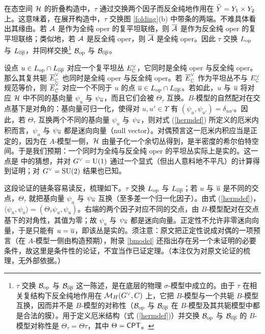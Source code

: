 在态空间 ${\mathcal H}$ 的折叠构造中，$\tau$ 通过交换两个因子而反全纯地作用在 $\widehat Y=Y_1\times Y_2$ 上。这意味着，在展开构造中，$\tau$ 交换图 \ref{folding}(b) 中带条的两端。不难具体看出其缘由。若 ${\mathcal A}$ 是作为全纯 oper 的复平坦联络，则 $\overline{{\mathcal A}}$ 是作为反全纯 oper 的复平坦联络；类似地，若 ${\mathcal A}$ 是反全纯 oper，则 $\overline{{\mathcal A}}$ 是全纯 oper。因此 $\tau$ 交换 $L_{\mathrm{op}}$ 与 $L_{\overline{\mathrm{op}}}$，并同样交换\footnote{$\tau$ 交换 ${\mathcal B}_{\mathrm{op}}$ 与 ${\mathcal B}_{\overline{\mathrm{op}}}$ 这一陈述，是在底层的物理 $\sigma$-模型中成立的。由于 $\tau$ 在相关复结构下反全纯地作用在 ${\mathcal M}_H(G^\vee,C)$ 上，它把 $B$-模型与一个共轭 $B$-模型互换，因而并不是 $B$-模型的对称性（${\mathcal B}_{\mathrm{op}}$ 与 ${\mathcal B}_{\overline{\mathrm{op}}}$ 在 $B$-模型及其共轭模型中都是合法的膜）。用于定义厄米结构（式 (\ref{hermdef})）并交换 ${\mathcal B}_{\mathrm{op}}$ 与 ${\mathcal B}_{\overline{\mathrm{op}}}$ 的 $B$-模型对称性是 $\Theta_\tau=\Theta\tau$，其中 $\Theta=\sf{CPT}$。} ${\mathcal B}_{\mathrm{op}}$ 与 ${\mathcal B}_{\overline{\mathrm{op}}}$。

设点 $u\in L_{\mathrm{op}}\cap L_{\overline{\mathrm{op}}}$ 对应一个复平坦丛 $E^\vee_{\mathbb C}$，它同时是全纯 oper 与反全纯 oper。那么其复共轭 $\overline E^\vee_{\mathbb C}$ 也同时是全纯 oper 与反全纯 oper。若 $\overline E^\vee_{\mathbb C}$ 作为平坦丛不与 $E^\vee_{\mathbb C}$ 规范等价，则 $\overline E^\vee_{\mathbb C}$ 对应一个不同于 $u$ 的点 $\overline u\in L_{\mathrm{op}}\cap L_{\overline{\mathrm{op}}}$。若如此，$u$ 与 $\overline u$ 将对应 ${\mathcal H}$ 中不同的基向量 $\psi_u$ 与 $\psi_{\overline u}$，而且它们会被 $\Theta_\tau$ 互换。$B$-模型的自然配对在交点基下是对角的：基向量可归一化，使得对 $u,u'\in \Upsilon$ 有 $(\psi_u,\psi_{u'})=\delta_{uu'}$。因此，若 $\Theta_\tau$ 互换两个不同的基向量 $\psi_u$ 与 $\psi_{\overline u}$，则对式 (\ref{hermdef}) 所定义的厄米内积而言，$\psi_u$ 与 $\psi_{\overline u}$ 都是迷向向量（null vector）。对偶预言这一厄米内积应当是正定的，因为在 $A$-模型一侧，${\mathcal H}$ 由量子化一个余切丛得到，是半密度的希尔伯特空间。于是我们预期：一个同时为全纯与反全纯 oper 的平坦丛实际上是实的。这一点是\cite{EFK,EFK2} 中的猜想，并对 $G^\vee={\mathrm U}(1)$ 通过一个显式（但出人意料地不平凡）的计算得到证明；对 $G^\vee={\mathrm{SU}}(2)$ 结果也已知\cite{Fal,Go}。

\begin{yizhu}
这段论证的链条容易读反，梳理如下。$\tau$ 交换 $L_{\mathrm{op}}$ 与 $L_{\overline{\mathrm{op}}}$；若 $u$ 与 $\overline u$ 是不同的交点，$\Theta_\tau$ 就把基向量 $\psi_u$ 与 $\psi_{\overline u}$ 互换（至多差一个归一化因子）。由式 (\ref{hermdef})，$\langle\psi_u,\psi_u\rangle=(\Theta_\tau\psi_u,\psi_u)$。右端的两个因子对应不同的交点，由 $B$-模型配对在交点基下的对角性，其值为零；故 $\psi_u$ 与 $\psi_{\overline u}$ 都是迷向向量。正定性不允许非零迷向向量，于是只能有 $u=\overline u$，即该丛是实的。须注意：原文把正定性说成对偶的一项预言（在 $A$-模型一侧由构造预期），附录 \ref{bmodel} 还指出存在另一个未证明的必要条件，故这里是条件性的论证，不宜当作已证定理。（本注仅为对原文论证的梳理，无外部依据。）
\end{yizhu}

